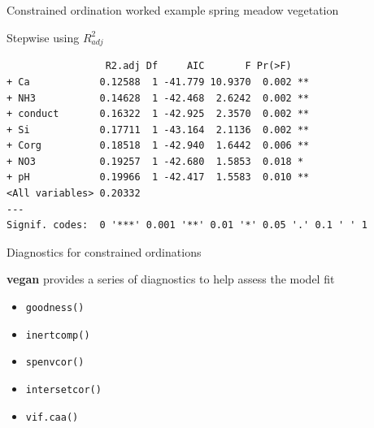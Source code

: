 \documentclass[10pt,ignorenonframetext,compress, aspectratio=169]{beamer}
\newenvironment{Shaded}{\begin{snugshade}}{\end{snugshade}}
\newcommand{\KeywordTok}[1]{\textcolor[rgb]{0.13,0.29,0.53}{\textbf{{#1}}}}
\newcommand{\DataTypeTok}[1]{\textcolor[rgb]{0.13,0.29,0.53}{{#1}}}
\newcommand{\StringTok}[1]{\textcolor[rgb]{0.31,0.60,0.02}{{#1}}}
\newcommand{\OtherTok}[1]{\textcolor[rgb]{0.56,0.35,0.01}{{#1}}}
\newcommand{\NormalTok}[1]{{#1}}
\begin{document}
\begin{frame}[fragile]{Constrained ordination worked example \textbar{}
spring meadow vegetation}

Stepwise using $R^2_{adj}$

\scriptsize

\begin{Shaded}
\end{Shaded}

\begin{verbatim}
                 R2.adj Df     AIC       F Pr(>F)   
+ Ca            0.12588  1 -41.779 10.9370  0.002 **
+ NH3           0.14628  1 -42.468  2.6242  0.002 **
+ conduct       0.16322  1 -42.925  2.3570  0.002 **
+ Si            0.17711  1 -43.164  2.1136  0.002 **
+ Corg          0.18518  1 -42.940  1.6442  0.006 **
+ NO3           0.19257  1 -42.680  1.5853  0.018 * 
+ pH            0.19966  1 -42.417  1.5583  0.010 **
<All variables> 0.20332                             
---
Signif. codes:  0 '***' 0.001 '**' 0.01 '*' 0.05 '.' 0.1 ' ' 1
\end{verbatim}

\normalsize

\end{frame}

\begin{frame}{Diagnostics for constrained ordinations}

\textbf{vegan} provides a series of diagnostics to help assess the model
fit

\begin{itemize}
\itemsep1pt\parskip0pt
\item
  \texttt{goodness()}
\item
  \texttt{inertcomp()}
\item
  \texttt{spenvcor()}
\item
  \texttt{intersetcor()}
\item
  \texttt{vif.caa()}
\end{itemize}

\end{frame}
\end{document}
